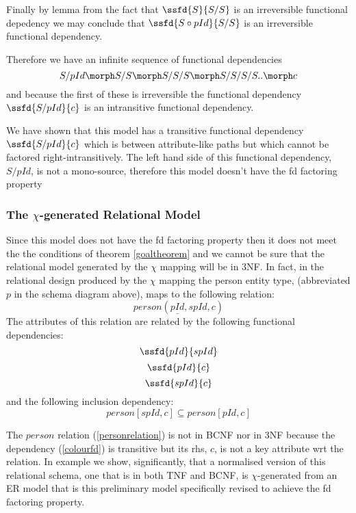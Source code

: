 Finally by lemma  from the fact that $\ssfd{S}{S/S}$  is an irreversible functional depedency
we may conclude that $\ssfd{S \circ pId}{S/S}$ is an irreversible functional dependency.

Therefore we have an infinite sequence of functional dependencies
\begin{equation}
S/pId \morph S/S \morph S/S/S \morph S/S/S/S .. \morph c
\end{equation}
and because the first of these is irreversible
the functional dependency
$\ssfd{S/pId}{c} $ 
is an intransitive functional dependency.

We have shown that this model has a transitive functional dependency $\ssfd{S/pId}{c}$ which is between
attribute-like paths but which cannot be factored right-intransitively. The left hand side of this functional dependency, $S/pId$, is not a mono-source, therefore this model doesn't have the fd factoring property 

\subsubsection{The $\chi$-generated Relational Model}
Since this model does not have the fd factoring property then it does not meet the the conditions of theorem \ref{goaltheorem} and  we cannot be sure that the relational model generated by the $\chi$ mapping will  be in 3NF.
In fact, in the relational design produced by the $\chi$ mapping the person entity type, (abbreviated $p$ in the schema diagram above), maps to the following relation:
\begin{equation}
\label{personrelation}
person(\underline{pId}, spId, c)
\end{equation}
The  attributes of this relation are related by the following  functional dependencies:
\begin{equation}
\ssfd{pId}{spId}
\end{equation}
\begin{equation}
\label{colourfd}
\ssfd{pId}{c}
\end{equation}
\begin{equation}
\ssfd{spId}{c}
\end{equation}
and the following  inclusion dependency:
\begin{equation}
\label{spIdcolour1}
person[spId,c] \subseteq person[pId,c]
\end{equation}

The $person$ relation (\ref{personrelation}) is not in BCNF nor in 3NF because the dependency (\ref{colourfd}) is transitive but its rhs, $c$, is not a key attribute wrt the relation. 
In example  we show, significantly,  that a normalised version of this relational schema, one that is in both TNF and BCNF, is 
$\chi$-generated from an ER model that is this preliminary model specifically revised to achieve the fd factoring property. 



